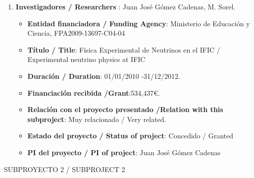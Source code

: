\begin{enumerate}
\begin{itemize}
\item {\bf Título / Title}:  Coordination of NEXT Project.
\item {\bf Duración / Duration}: 01/01/2013 -31/12/2014. 
\item {\bf Financiación recibida /Grant}:256,000\euro. 
\item {\bf Relación con el proyecto presentado /Relation with this subproject}: Mismo tema /Same topic. 
\item {\bf Estado del proyecto / Status of project}: Concedido / Granted
\item {\bf PI del proyecto / PI of project}: Juan José Gómez Cadenas 
\end{itemize}
\item {\bf Investigadores / Researchers }: Juan José Gómez Cadenas, M. Sorel.
\begin{itemize}
\item {\bf Entidad financiadora / Funding Agency}:  Ministerio de Educaci\'on y Ciencia, FPA2009-13697-C04-04
\item {\bf Título / Title}:  Física Experimental de Neutrinos en el IFIC / Experimental neutrino physics at IFIC
\item {\bf Duración / Duration}: 01/01/2010 -31/12/2012. 
\item {\bf Financiación recibida /Grant}:534,437\euro. 
\item {\bf Relación con el proyecto presentado /Relation with this subproject}: Muy relacionado / Very related. 
\item {\bf Estado del proyecto / Status of project}: Concedido / Granted
\item {\bf PI del proyecto / PI of project}: Juan José Gómez Cadenas 
\end{itemize}
\end{enumerate}

{\sc SUBPROYECTO 2 / SUBPROJECT 2}

